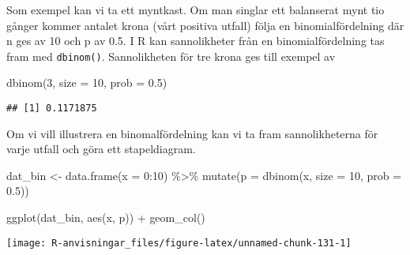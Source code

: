 \documentclass[
]{book}
\newenvironment{Shaded}{\begin{snugshade}}{\end{snugshade}}
\newcommand{\AttributeTok}[1]{\textcolor[rgb]{0.77,0.63,0.00}{#1}}
\newcommand{\DecValTok}[1]{\textcolor[rgb]{0.00,0.00,0.81}{#1}}
\newcommand{\FloatTok}[1]{\textcolor[rgb]{0.00,0.00,0.81}{#1}}
\newcommand{\FunctionTok}[1]{\textcolor[rgb]{0.00,0.00,0.00}{#1}}
\newcommand{\NormalTok}[1]{#1}
\newcommand{\OtherTok}[1]{\textcolor[rgb]{0.56,0.35,0.01}{#1}}
\newcommand{\SpecialCharTok}[1]{\textcolor[rgb]{0.00,0.00,0.00}{#1}}
\theoremstyle{definition}
\theoremstyle{definition}
\theoremstyle{definition}
\theoremstyle{definition}
\theoremstyle{remark}
\begin{document}
Som exempel kan vi ta ett myntkast. Om man singlar ett balanserat mynt tio gånger kommer antalet krona (vårt positiva utfall) följa en binomialfördelning där n ges av 10 och p av 0.5. I R kan sannolikheter från en binomialfördelning tas fram med \texttt{dbinom()}. Sannolikheten för tre krona ges till exempel av

\begin{Shaded}
\begin{Highlighting}[]
\FunctionTok{dbinom}\NormalTok{(}\DecValTok{3}\NormalTok{, }\AttributeTok{size =} \DecValTok{10}\NormalTok{, }\AttributeTok{prob =} \FloatTok{0.5}\NormalTok{)}
\end{Highlighting}
\end{Shaded}

\begin{verbatim}
## [1] 0.1171875
\end{verbatim}

Om vi vill illustrera en binomalfördelning kan vi ta fram sannolikheterna för varje utfall och göra ett stapeldiagram.

\begin{Shaded}
\begin{Highlighting}[]
\NormalTok{dat\_bin }\OtherTok{\textless{}{-}} \FunctionTok{data.frame}\NormalTok{(}\AttributeTok{x =} \DecValTok{0}\SpecialCharTok{:}\DecValTok{10}\NormalTok{) }\SpecialCharTok{\%\textgreater{}\%} 
  \FunctionTok{mutate}\NormalTok{(}\AttributeTok{p =} \FunctionTok{dbinom}\NormalTok{(x, }\AttributeTok{size =} \DecValTok{10}\NormalTok{, }\AttributeTok{prob =} \FloatTok{0.5}\NormalTok{))}

\FunctionTok{ggplot}\NormalTok{(dat\_bin, }\FunctionTok{aes}\NormalTok{(x, p)) }\SpecialCharTok{+} \FunctionTok{geom\_col}\NormalTok{()}
\end{Highlighting}
\end{Shaded}

\begin{center}\texttt{[image: R-anvisningar\_files/figure-latex/unnamed-chunk-131-1]} \end{center}
\end{document}
